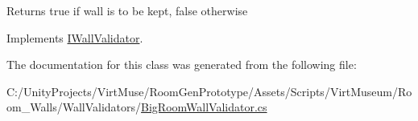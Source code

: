\begin{DoxyReturn}{Returns}
true if wall is to be kept, false otherwise
\end{DoxyReturn}


Implements \mbox{\hyperlink{interface_i_wall_validator_a1618acf45bf2614985aeb8b240bf7da8}{I\+Wall\+Validator}}.



The documentation for this class was generated from the following file\+:\begin{DoxyCompactItemize}
\item 
C\+:/\+Unity\+Projects/\+Virt\+Muse/\+Room\+Gen\+Prototype/\+Assets/\+Scripts/\+Virt\+Museum/\+Room\+\_\+\+Walls/\+Wall\+Validators/\mbox{\hyperlink{_big_room_wall_validator_8cs}{Big\+Room\+Wall\+Validator.\+cs}}\end{DoxyCompactItemize}
